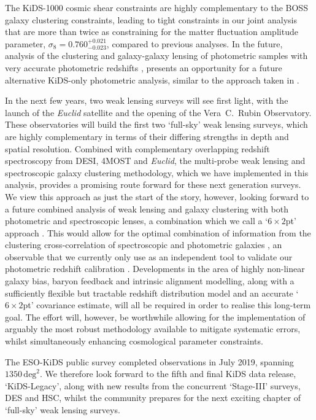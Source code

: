 The KiDS-1000 cosmic shear constraints are highly complementary to the BOSS galaxy clustering constraints, leading to tight constraints in our joint \tttp analysis that are more than twice as constraining for the matter fluctuation amplitude parameter, $\sigma_8 = 0.760^{+0.021}_{-0.023}$, compared to previous \tttp analyses.    In the future, analysis of the clustering and galaxy-galaxy lensing of photometric samples with very accurate photometric redshifts \citep[see for example][]{vakili/etal:2019}, presents an opportunity for a future alternative KiDS-only \tttp photometric analysis, similar to the approach taken in \citet{abbott/etal:2018}.

In the next few years, two weak lensing surveys will see first light, with the launch of the {\it Euclid} satellite and the opening of the Vera~C.~Rubin Observatory.   These observatories will build the first two `full-sky' weak lensing surveys, which are highly complementary in terms of their differing strengths in depth and spatial resolution.  Combined with complementary overlapping redshift spectroscopy from DESI, 4MOST and {\it Euclid}, the multi-probe weak lensing and spectroscopic galaxy clustering methodology, which we have implemented in this analysis, provides a promising route forward for these next generation surveys.   We view this \tttp approach as just the start of the story, however, looking forward to a future combined analysis of weak lensing and galaxy clustering with both photometric and spectroscopic lenses, a combination which we call a `$6\times2$pt' approach \citep{bernstein:2009}.    This would allow for the optimal combination of information from the clustering cross-correlation of spectroscopic and photometric galaxies \citep{newman:2008}, an observable that we currently only use as an independent tool to validate our photometric redshift calibration \citep{hildebrandt/etal:inprep}.      Developments in the area of highly non-linear galaxy bias, baryon feedback and intrinsic alignment modelling, along with a sufficiently flexible but tractable redshift distribution model and an accurate `$6\times2$pt' covariance estimate, will all be required in order to realise this long-term goal.   The effort will, however, be worthwhile allowing for the implementation of arguably the most robust methodology available to mitigate systematic errors, whilst simultaneously enhancing cosmological parameter constraints.

The ESO-KiDS public survey completed observations in July 2019, spanning $1350\,\mathrm{deg}^{2}$.   We therefore look forward to the fifth and final KiDS data release, `KiDS-Legacy', along with new results from the concurrent `Stage-III' surveys, DES and HSC, whilst the community prepares for the next exciting chapter of `full-sky' weak lensing surveys.  